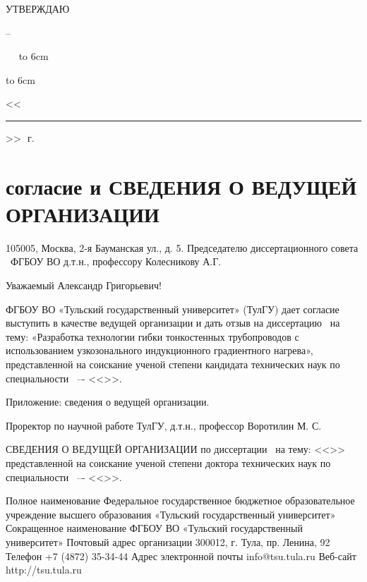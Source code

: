 
\hfill\parbox{6cm}{
	\centerline{УТВЕРЖДАЮ}
	\centerline{\leadingOrganizationHeadPos\---}
	\leadingOrganizationTitle
	
	\ktn~\leadingOrganizationHead\
	\linebreak
	{\hbox to 6cm{\hrulefill}}
	{\hbox to 6cm{<<\rule{7mm}{0.4pt}>>\hrulefill~\number\year\,г.}}}
\vspace{0.5cm}



\section{согласие и СВЕДЕНИЯ О ВЕДУЩЕЙ ОРГАНИЗАЦИИ}



105005, Москва, 2-я Бауманская ул., д. 5.
Председателю диссертационного совета \
ФГБОУ ВО \thesisOrganizationShort
д.т.н., профессору Колесникову А.Г.




Уважаемый Александр Григорьевич!

ФГБОУ ВО «Тульский государственный университет» (ТулГУ) дает согласие выступить в качестве ведущей организации и дать отзыв на диссертацию \thesisAuthorLastNameFromFull\ на тему: «Разработка технологии гибки тонкостенных трубопроводов с использованием узкозонального индукционного градиентного нагрева», представленной на соискание ученой степени кандидата технических наук по специальности \thesisSpecialtyNumber\ –- <<\thesisSpecialtyTitle>>.

Приложение: сведения о ведущей организации.





Проректор по научной работе ТулГУ, д.т.н., профессор		Воротилин М. С.








СВЕДЕНИЯ О ВЕДУЩЕЙ ОРГАНИЗАЦИИ
по диссертации \thesisAuthorLastNameFromFull\ на тему: <<\thesisTitle>> представленной на соискание ученой степени доктора технических наук по специальности 
\thesisSpecialtyNumber\ –- <<\thesisSpecialtyTitle>>.

Полное наименование	Федеральное государственное бюджетное образовательное учреждение высшего образования «Тульский государственный университет»
Сокращенное наименование	ФГБОУ ВО «Тульский государственный университет»
Почтовый адрес организации	300012, г. Тула, пр. Ленина, 92
Телефон	+7 (4872) 35-34-44
Адрес электронной почты	info@tsu.tula.ru
Веб-сайт	http://tsu.tula.ru

